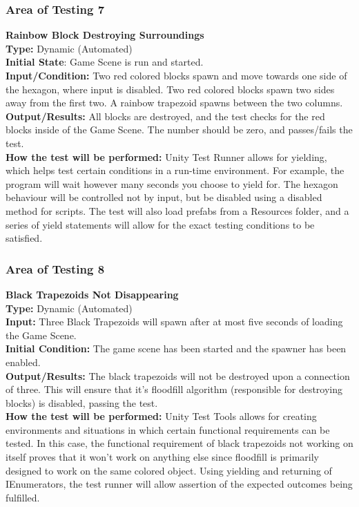 \documentclass[12pt, titlepage]{article}
\begin{document}
{\color{blue}
\subsubsection{Area of Testing 7}
\noindent \textbf{Rainbow Block Destroying Surroundings} \\
\textbf{Type:} Dynamic (Automated)\\
\textbf{Initial State}: Game Scene is run and started.\\
\textbf{Input/Condition:} Two red colored blocks spawn and move towards one side of the hexagon, where input is disabled. Two red colored blocks spawn two sides away from the first two.  A rainbow trapezoid spawns between the two columns.\\
\textbf{Output/Results:} All blocks are destroyed, and the test checks for the red blocks inside of the Game Scene. The number should be zero, and passes/fails the test.\\
\textbf{How the test will be performed:} Unity Test Runner allows for yielding, which helps test certain conditions in a run-time environment. For example, the program will wait however many seconds you choose to yield for. The hexagon behaviour will be controlled not by input, but be disabled using a disabled method for scripts. The test will also load prefabs from a Resources folder, and a series of yield statements will allow for the exact testing conditions to be satisfied.\\

\subsubsection{Area of Testing 8}
\noindent \textbf{Black Trapezoids Not Disappearing}\\
\textbf{Type:} Dynamic (Automated)\\
\textbf{Input:} Three Black Trapezoids will spawn after at most five seconds of loading the Game Scene.\\
\textbf{Initial Condition:} The game scene has been started and the spawner has been enabled.\\
\textbf{Output/Results:} The black trapezoids will not be destroyed upon a connection of three. This will ensure that it’s floodfill algorithm (responsible for destroying blocks) is disabled, passing the test.\\
\textbf{How the test will be performed:} Unity Test Tools allows for creating environments and situations in which certain functional requirements can be tested. In this case, the functional requirement of black trapezoids not working on itself proves that it won’t work on anything else since floodfill is primarily designed to work on the same colored object. Using yielding and returning of IEnumerators, the test runner will allow assertion of the expected outcomes being fulfilled. \\

}
\end{document}
